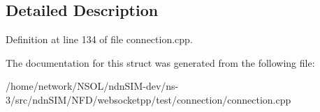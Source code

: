 \subsection{Detailed Description}


Definition at line 134 of file connection.\+cpp.



The documentation for this struct was generated from the following file\+:\begin{DoxyCompactItemize}
\item 
/home/network/\+N\+S\+O\+L/ndn\+S\+I\+M-\/dev/ns-\/3/src/ndn\+S\+I\+M/\+N\+F\+D/websocketpp/test/connection/connection.\+cpp\end{DoxyCompactItemize}

